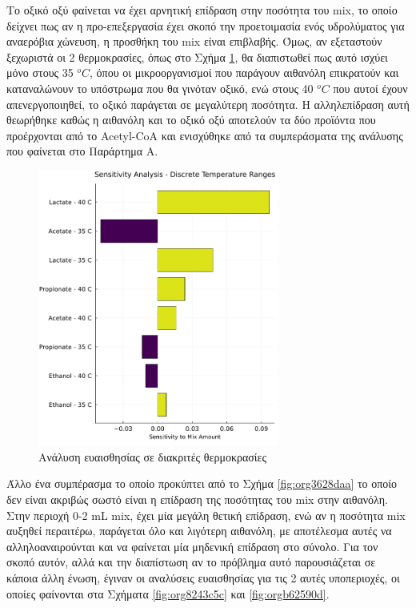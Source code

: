 \documentclass[11pt]{report}
\begin{document}
Το οξικό οξύ φαίνεται να έχει αρνητική επίδραση στην ποσότητα του \acrshort{mix}, το οποίο δείχνει πως αν η προ-επεξεργασία έχει σκοπό την προετοιμασία ενός υδρολύματος για αναερόβια χώνευση, η προσθήκη του \acrshort{mix} είναι επιβλαβής. Όμως, αν εξεταστούν ξεχωριστά οι 2 θερμοκρασίες, όπως στο Σχήμα \ref{fig:org839d85f}, θα διαπιστωθεί πως αυτό ισχύει μόνο στους 35 \(^oC\), όπου οι μικροοργανισμοί που παράγουν αιθανόλη επικρατούν και καταναλώνουν το υπόστρωμα που θα γινόταν οξικό, ενώ στους 40 \(^oC\) που αυτοί έχουν απενεργοποιηθεί, το οξικό παράγεται σε μεγαλύτερη ποσότητα. Η αλληλεπίδραση αυτή θεωρήθηκε καθώς η αιθανόλη και το οξικό οξύ αποτελούν τα δύο προϊόντα που προέρχονται από το Acetyl-CoA και ενισχύθηκε από τα συμπεράσματα της ανάλυσης που φαίνεται στο Παράρτημα A. 

\begin{figure}[htbp]
\centering
\includegraphics[width=300px]{../plots/sensitivity/temperature_tornado.png}
\caption{\label{fig:org839d85f}Ανάλυση ευαισθησίας σε διακριτές θερμοκρασίες}
\end{figure}

Άλλο ένα συμπέρασμα το οποίο προκύπτει από το Σχήμα \ref{fig:org3628daa} το οποίο δεν είναι ακριβώς σωστό είναι η επίδραση της ποσότητας του \acrshort{mix} στην αιθανόλη. Στην περιοχή 0-2 mL \acrshort{mix}, έχει μία μεγάλη θετική επίδραση, ενώ αν η ποσότητα \acrshort{mix} αυξηθεί περαιτέρω, παράγεται όλο και λιγότερη αιθανόλη, με αποτέλεσμα αυτές να αλληλοαναιρούνται και να φαίνεται μία μηδενική επίδραση στο σύνολο. Για τον σκοπό αυτόν, αλλά και την διαπίστωση αν το πρόβλημα αυτό παρουσιάζεται σε κάποια άλλη ένωση, έγιναν οι αναλύσεις ευαισθησίας για τις 2 αυτές υποπεριοχές, οι οποίες φαίνονται στα Σχήματα \ref{fig:org8243c5c} και \ref{fig:orgb62590d}.
\end{document}
